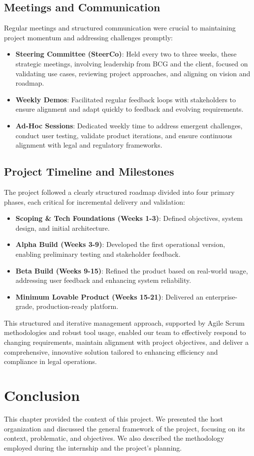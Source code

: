 \subsection{Meetings and Communication}
Regular meetings and structured communication were crucial to maintaining project momentum and addressing challenges promptly:

\begin{itemize}
    \item \textbf{Steering Committee (SteerCo)}: Held every two to three weeks, these strategic meetings, involving leadership from BCG and the client, focused on validating use cases, reviewing project approaches, and aligning on vision and roadmap.
    \item \textbf{Weekly Demos}: Facilitated regular feedback loops with stakeholders to ensure alignment and adapt quickly to feedback and evolving requirements.
    \item \textbf{Ad-Hoc Sessions}: Dedicated weekly time to address emergent challenges, conduct user testing, validate product iterations, and ensure continuous alignment with legal and regulatory frameworks.
\end{itemize}

\subsection{Project Timeline and Milestones}
The project followed a clearly structured roadmap divided into four primary phases, each critical for incremental delivery and validation:

\begin{itemize}
    \item \textbf{Scoping \& Tech Foundations (Weeks 1-3)}: Defined objectives, system design, and initial architecture.
    \item \textbf{Alpha Build (Weeks 3-9)}: Developed the first operational version, enabling preliminary testing and stakeholder feedback.
    \item \textbf{Beta Build (Weeks 9-15)}: Refined the product based on real-world usage, addressing user feedback and enhancing system reliability.
    \item \textbf{Minimum Lovable Product (Weeks 15-21)}: Delivered an enterprise-grade, production-ready platform.
\end{itemize}

This structured and iterative management approach, supported by Agile Scrum methodologies and robust tool usage, enabled our team to effectively respond to changing requirements, maintain alignment with project objectives, and deliver a comprehensive, innovative solution tailored to enhancing efficiency and compliance in legal operations.


\section{Conclusion}
This chapter provided the context of this project. We presented the host organization and discussed the general framework of the project, focusing on its context, problematic, and objectives. We also described  the methodology employed during the internship and the project's planning.
